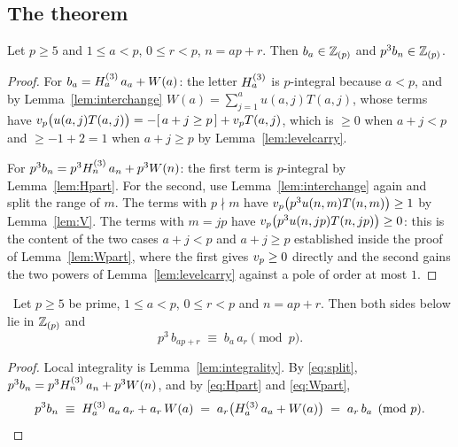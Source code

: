 \subsection{The theorem}

\begin{lemma}\label{lem:integrality}
Let $p\ge5$ and $1\le a<p$, $0\le r<p$, $n=ap+r$. Then $b_a\in\mathbb{Z}_{(p)}$ and $p^3b_n\in\mathbb{Z}_{(p)}$.
\end{lemma}

\begin{proof}
For $b_a=H^{(3)}_{a}\,a_a+W(a)$: the letter $H^{(3)}_{a}$ is $p$-integral because $a<p$, and by
Lemma~\ref{lem:interchange} $W(a)=\sum_{j=1}^{a}u(a,j)T(a,j)$, whose terms have
$v_p\bigl(u(a,j)T(a,j)\bigr)=-[\,a+j\ge p\,]+v_p T(a,j)$, which is $\ge0$ when $a+j<p$ and
$\ge-1+2=1$ when $a+j\ge p$ by Lemma~\ref{lem:levelcarry}.

For $p^3b_n=p^3H^{(3)}_{n}\,a_n+p^3W(n)$: the first term is $p$-integral by
Lemma~\ref{lem:Hpart}. For the second, use Lemma~\ref{lem:interchange} again and split the
range of $m$. The terms with $p\nmid m$ have $v_p\bigl(p^3u(n,m)T(n,m)\bigr)\ge1$ by
Lemma~\ref{lem:V}. The terms with $m=jp$ have $v_p\bigl(p^3u(n,jp)T(n,jp)\bigr)\ge0$: this is
the content of the two cases $a+j<p$ and $a+j\ge p$ established inside the proof of
Lemma~\ref{lem:Wpart}, where the first gives $v_p\ge0$ directly and the second gains the two
powers of Lemma~\ref{lem:levelcarry} against a pole of order at most $1$.
\end{proof}

\begin{theorem}\label{thm:brow}
\Proved\ Let $p\ge5$ be prime, $1\le a<p$, $0\le r<p$ and $n=ap+r$. Then both sides below
lie in $\mathbb{Z}_{(p)}$ and
\[
   p^3\,b_{ap+r}\;\equiv\;b_a\,a_r\pmod p .
\]
\end{theorem}

\begin{proof}
Local integrality is Lemma~\ref{lem:integrality}. By \eqref{eq:split},
$p^3b_n=p^3H^{(3)}_{n}\,a_n+p^3W(n)$, and by \eqref{eq:Hpart} and \eqref{eq:Wpart},
\[
  p^3b_n\;\equiv\;H^{(3)}_{a}\,a_a\,a_r+a_r\,W(a)
  \;=\;a_r\bigl(H^{(3)}_{a}\,a_a+W(a)\bigr)\;=\;a_r\,b_a \pmod p . \qedhere
\]
\end{proof}

